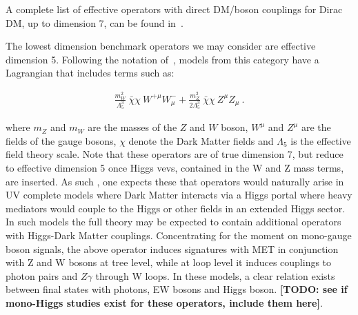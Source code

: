 
A complete list of effective operators with direct DM/boson couplings for
Dirac DM, up to dimension 7, can be found in~\cite{Cotta:2012nj}.

The lowest dimension benchmark operators we may consider are effective dimension 5.  Following the notation of~\cite{Carpenter:2012rg},  models
from this category have a Lagrangian that includes terms such as:

\begin{eqnarray}
\frac{m_W^2}{\Lambda_5^3} ~\bar{\chi} \chi ~W^{+ \mu} W^{-}_\mu
+ \frac{m_Z^2}{2 \Lambda_5^3} ~ \bar{\chi} \chi ~ Z^\mu Z_\mu ~.
\end{eqnarray}

where $m_Z$ and $m_W$ are the masses of the $Z$ and $W$ boson, $W^{\mu}$ and $Z^{\mu}$
are the fields of the gauge bosons, $\chi$ denote the Dark Matter fields
and $\Lambda_5$ is the effective field theory scale.  Note that these operators are of true dimension 7, 
but reduce to effective dimension 5 once Higgs vevs, contained in the W and Z mass terms, are inserted.  
As such , one expects  these that operators would naturally  arise in UV complete models where Dark Matter 
interacts via a Higgs portal where heavy mediators would couple to the Higgs or other fields in an extended Higgs sector. 
In such models the full theory may be expected to contain additional operators with Higgs-Dark Matter couplings. 
Concentrating  for the moment on mono-gauge boson signals, the above operator induces signatures with 
MET in conjunction with Z and W bosons at tree level,
while at loop level it induces couplings to photon pairs and $Z \gamma$ through W loops.
In these models, a clear relation exists between final states with photons, EW bosons
and Higgs boson. \textbf{[TODO: see if mono-Higgs studies exist for these operators, include them here]}.


